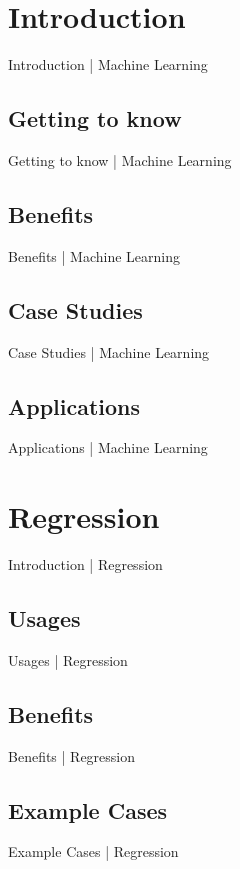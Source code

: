 \documentclass[10pt]{beamer}
\begin{document}
\section{Introduction}
\begin{frame}{Introduction | Machine Learning}
\end{frame}
\subsection{Getting to know}
\begin{frame}{Getting to know | Machine Learning}
\end{frame}
\subsection{Benefits}
\begin{frame}{Benefits | Machine Learning}
\end{frame}
\subsection{Case Studies}
\begin{frame}{Case Studies | Machine Learning}
\end{frame}
\subsection{Applications}
\begin{frame}{Applications | Machine Learning}
\end{frame}

\section{Regression}
\begin{frame}{Introduction | Regression}
\end{frame}
\subsection{Usages}
\begin{frame}{Usages | Regression}
\end{frame}
\subsection{Benefits}
\begin{frame}{Benefits | Regression}
\end{frame}
\subsection{Example Cases}
\begin{frame}{Example Cases | Regression}
\end{frame}
\end{document}
